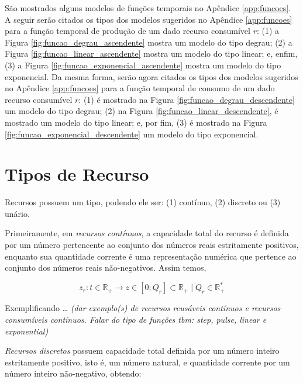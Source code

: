         São mostrados alguns modelos de funções temporais no Apêndice \ref{app:funcoes}. A seguir serão citados os tipos dos modelos sugeridos no Apêndice \ref{app:funcoes} para a função temporal de produção de um dado recurso consumível $r$: (1) a Figura \ref{fig:funcao_degrau_ascendente} mostra um modelo do tipo degrau; (2) a Figura \ref{fig:funcao_linear_ascendente} mostra um modelo do tipo linear; e, enfim, (3) a Figura \ref{fig:funcao_exponencial_ascendente} mostra um modelo do tipo exponencial. Da mesma forma, serão agora citados os tipos dos modelos sugeridos no Apêndice \ref{app:funcoes} para a função temporal de consumo de um dado recurso consumível $r$: (1) é mostrado na Figura \ref{fig:funcao_degrau_descendente} um modelo do tipo degrau; (2) na Figura \ref{fig:funcao_linear_descendente}, é mostrado um modelo do tipo linear; e, por fim, (3) é mostrado na Figura \ref{fig:funcao_exponencial_descendente} um modelo do tipo exponencial.
        
    
    \section{Tipos de Recurso} \label{sec:tipos_recurso}
    
        Recursos possuem um tipo, podendo ele ser: (1) contínuo, (2) discreto ou (3) unário. 
        
        Primeiramente, em \textit{recursos contínuos}, a capacidade total do recurso é definida por um número pertencente ao conjunto dos números reais estritamente positivos, enquanto sua quantidade corrente é uma representação numérica que pertence ao conjunto dos números reais não-negativos. Assim temos, 
        
        \begin{equation} \label{eq:recurso_continuo}
            z_r: t \in \mathbb{R}_+ \to z \in [0; Q_r] \subset \mathbb{R}_+ \mid Q_r \in \mathbb{R}_+^*
        \end{equation}
        
        Exemplificando \dots \emph{\color{red} (dar exemplo(s) de recursos reusáveis contínuos e recursos consumíveis contínuos. Falar do tipo de funções tbm: \textit{step}, \textit{pulse}, \textit{linear} e \textit{exponential})}
        
        \textit{Recursos discretos} possuem capacidade total definida por um número inteiro estritamente positivo, isto é, um número natural, e quantidade corrente por um número inteiro não-negativo, obtendo:
        
